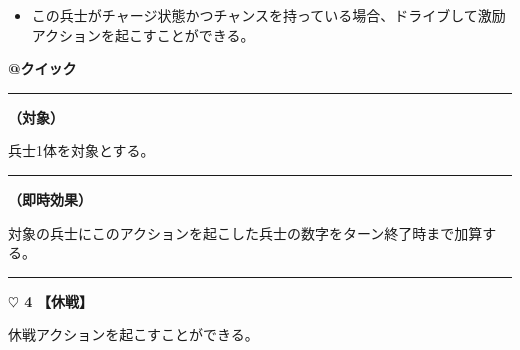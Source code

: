 \documentclass[twocolumn,a5paper,papersize,10pt]{jarticle}
\begin{document}
\vspace{-1zh}%
\begin{itemize}
\setlength{\leftskip}{-0.3cm}
\setlength{\parskip}{0pt} %

\item この兵士がチャージ状態かつチャンスを持っている場合、ドライブして激励アクションを起こすことができる。
\vspace{-1zh}%
\end{itemize}

\begin{tcolorbox}[title={\small\bf【Action】激励}{\scriptsize （兵士起因）}]

{\scriptsize\bf @クイック }

\vspace{1mm} %
\hrule height 0.1mm depth 0mm width 62mm %
\vspace{1mm} %

{\bf（対象）}

兵士1体を対象とする。

\vspace{1mm} %
\hrule height 0.1mm depth 0mm width 62mm %
\vspace{1mm} %

{\bf（即時効果）}

対象の兵士にこのアクションを起こした兵士の数字をターン終了時まで加算する。

\vspace{1mm} %
\end{tcolorbox}

\vspace{-1zh}

 
 
 
 
 

\vspace{3mm} %
\hrule height 0.5mm depth 0mm width 66.5mm %
\vspace{1mm} %
{\Large\bf $\heartsuit$ 4} {\normalsize\bf【休戦】} %
\vspace{1mm} %

休戦アクションを起こすことができる。
\end{document}

